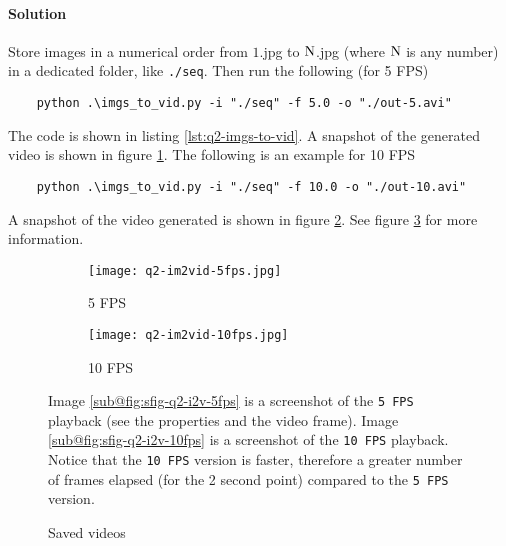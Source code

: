 \paragraph{Solution}
Store images in a numerical order from $1$.jpg to $\textup{N}$.jpg (where $\textup{N}$ is any number) in a dedicated folder, like \texttt{./seq}. Then run the following (for 5 FPS)

\begin{verbatim}
    python .\imgs_to_vid.py -i "./seq" -f 5.0 -o "./out-5.avi"
\end{verbatim}

The code is shown in listing \ref{lst:q2-imgs-to-vid}. A snapshot of the generated video is shown in figure \ref{fig:sfig-q2-i2v-5fps}.
The following is an example for 10 FPS

\begin{verbatim}
    python .\imgs_to_vid.py -i "./seq" -f 10.0 -o "./out-10.avi"
\end{verbatim}

A snapshot of the video generated is shown in figure \ref{fig:sfig-q2-i2v-10fps}. See figure \ref{fig:q2-i2v-imgs} for more information.



\begin{figure}[t]
    \centering
    \begin{subfigure}[b]{0.45\textwidth}
        \texttt{[image: q2-im2vid-5fps.jpg]}
        \caption{5 FPS}
        \label{fig:sfig-q2-i2v-5fps}
    \end{subfigure}
    \begin{subfigure}[b]{0.45\textwidth}
        \texttt{[image: q2-im2vid-10fps.jpg]}
        \caption{10 FPS}
        \label{fig:sfig-q2-i2v-10fps}
    \end{subfigure}
    \caption{Saved videos}
    \label{fig:q2-i2v-imgs}
    \small
        Image \ref{sub@fig:sfig-q2-i2v-5fps} is a screenshot of the \texttt{5 FPS} playback (see the properties and the video frame). Image \ref{sub@fig:sfig-q2-i2v-10fps} is a screenshot of the \texttt{10 FPS} playback. Notice that the \texttt{10 FPS} version is faster, therefore a greater number of frames elapsed (for the 2 second point) compared to the \texttt{5 FPS} version.
\end{figure}
